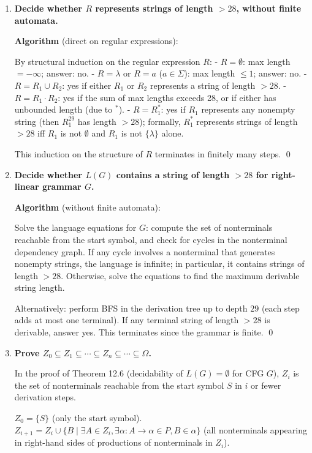 \begin{enumerate}[{12.}1. ]
\item \textbf{Decide whether $R$ represents strings of length $> 28$, without finite automata.}

\textbf{Algorithm} (direct on regular expressions):

By structural induction on the regular expression $R$:
- $R = \pmb{\emptyset}$: max length $= -\infty$; answer: no.
- $R = \lambda$ or $R = a$ ($a\in\Sigma$): max length $\leq 1$; answer: no.
- $R = R_1 \cup R_2$: yes if either $R_1$ or $R_2$ represents a string of length $>28$.
- $R = R_1 \cdot R_2$: yes if the sum of max lengths exceeds 28, or if either has unbounded length (due to $^*$).
- $R = R_1^*$: yes if $R_1$ represents any nonempty string (then $R_1^{29}$ has length $>28$); formally, $R_1^*$ represents strings of length $>28$ iff $R_1$ is not $\pmb{\emptyset}$ and $R_1$ is not $\{\lambda\}$ alone.

This induction on the structure of $R$ terminates in finitely many steps. \qed

\item \textbf{Decide whether $L(G)$ contains a string of length $>28$ for right-linear grammar $G$.}

\textbf{Algorithm} (without finite automata):

Solve the language equations for $G$: compute the set of nonterminals reachable from the start symbol, and check for cycles in the nonterminal dependency graph. If any cycle involves a nonterminal that generates nonempty strings, the language is infinite; in particular, it contains strings of length $>28$. Otherwise, solve the equations to find the maximum derivable string length.

Alternatively: perform BFS in the derivation tree up to depth $29$ (each step adds at most one terminal). If any terminal string of length $>28$ is derivable, answer yes. This terminates since the grammar is finite. \qed

\item \textbf{Prove $Z_0\subseteq Z_1\subseteq\cdots\subseteq Z_n\subseteq\cdots\subseteq\Omega$.}

In the proof of Theorem 12.6 (decidability of $L(G)=\emptyset$ for CFG $G$), $Z_i$ is the set of nonterminals reachable from the start symbol $S$ in $i$ or fewer derivation steps.

$Z_0 = \{S\}$ (only the start symbol).
$Z_{i+1} = Z_i \cup \{B \mid \exists A\in Z_i, \exists \alpha: A\to\alpha\in P, B\in\alpha\}$ (all nonterminals appearing in right-hand sides of productions of nonterminals in $Z_i$).


\end{enumerate}
